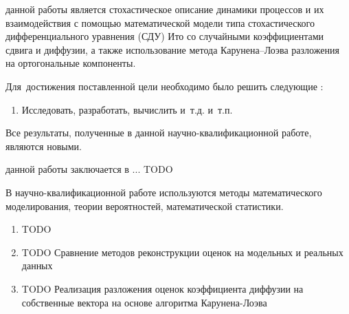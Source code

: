 

{\aim} данной работы является стохастическое описание динамики процессов и их взаимодействия с помощью математической модели типа стохастического дифференциального уравнения (СДУ) Ито со случайными коэффициентами сдвига и диффузии, а также использование метода Карунена--Лоэва разложения на ортогональные компоненты.

Для~достижения поставленной цели необходимо было решить следующие {\tasks}:
\begin{enumerate}[beginpenalty=10000] %
  \item Исследовать, разработать, вычислить и~т.\:д. и~т.\:п.
\end{enumerate}


{\novelty}
Все результаты, полученные в данной научно-квалификационной
работе, являются новыми.
	

{\influence} данной работы заключается в ... TODO

{\methods} В научно-квалификационной работе используются методы математического моделирования, теории вероятностей, математической статистики.

{}
\begin{enumerate}[beginpenalty=10000] %
  \item TODO
  \item TODO Сравнение методов реконструкции оценок на модельных и реальных данных
  \item TODO Реализация разложения оценок коэффициента диффузии на собственные вектора на основе алгоритма Карунена-Лоэва
\end{enumerate}

